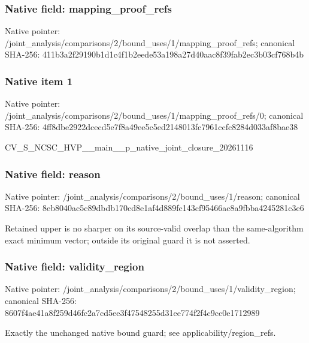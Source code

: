 \documentclass[10pt,a4paper]{article}
\begin{document}
\subsubsection{Native field: mapping\_\allowbreak{}proof\_\allowbreak{}refs}
Native pointer: /joint\_\allowbreak{}analysis/comparisons/2/bound\_\allowbreak{}uses/1/mapping\_\allowbreak{}proof\_\allowbreak{}refs; canonical SHA-256: 411b3a2f29190b1d1c4f1b2eede53a198a27d40aac8f39fab2ec3b03cf768b4b

\subsubsection{Native item 1}
Native pointer: /joint\_\allowbreak{}analysis/comparisons/2/bound\_\allowbreak{}uses/1/mapping\_\allowbreak{}proof\_\allowbreak{}refs/0; canonical SHA-256: 4ff8dbe2922dcecd5e7f8a49ee5c5ed2148013fc7961ccfc8284d033af8bae38

\begingroup\raggedright\sloppy CV\_\allowbreak{}S\_\allowbreak{}NCSC\_\allowbreak{}HVP\_\allowbreak{}\_\allowbreak{}main\_\allowbreak{}\_\allowbreak{}p\_\allowbreak{}native\_\allowbreak{}joint\_\allowbreak{}closure\_\allowbreak{}20261116\par\endgroup

\subsubsection{Native field: reason}
Native pointer: /joint\_\allowbreak{}analysis/comparisons/2/bound\_\allowbreak{}uses/1/reason; canonical SHA-256: 8eb8040ac5c89dbdb170cd8e1af4d889fc143cf95466ac8a9fbba4245281c3e6

\begingroup\raggedright\sloppy Retained upper is no sharper on its source-valid overlap than the same-algorithm exact minimum vector;\allowbreak{} outside its original guard it is not asserted.\par\endgroup

\subsubsection{Native field: validity\_\allowbreak{}region}
Native pointer: /joint\_\allowbreak{}analysis/comparisons/2/bound\_\allowbreak{}uses/1/validity\_\allowbreak{}region; canonical SHA-256: 8607f4ae41a8f259d46fc2a7cd5ee3f47548255d31ee774f2f4c9cc0e1712989

\begingroup\raggedright\sloppy Exactly the unchanged native bound guard;\allowbreak{} see applicability/\allowbreak{}region\_\allowbreak{}refs.\par\endgroup
\end{document}
